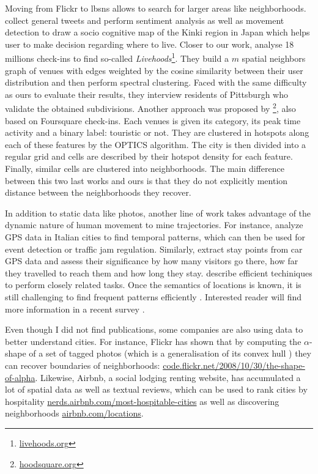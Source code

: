 Moving from Flickr to \glspl{lbsn} allows to search for larger areas like
neighborhoods. \Textcite{SocioMap12} collect general tweets and perform
sentiment analysis as well as movement detection to draw a socio cognitive map
of the Kinki region in Japan which helps user to make decision regarding where
to live. Closer to our work, \textcite{Livehoods12} analyse 18 millions
check-ins to find so-called
\emph{Livehoods}\footnote{\href{http://livehoods.org/}{\url{livehoods.org}}}.
They build a $m$ spatial neighbors graph of venues with edges weighted by the
cosine similarity between their user distribution and then perform spectral
clustering. Faced with the same difficulty as ours to evaluate their results, they
interview residents of Pittsburgh who validate the obtained subdivisions.
Another approach was proposed by
\textcite{Hoodsquare13}\footnote{\href{http://pizza.cl.cam.ac.uk/hoodsquare/}%
{\url{hoodsquare.org}}}, also based on Foursquare check-ins. Each
venues is given its category, its peak time activity and a binary
label: touristic or not. They are clustered in hotspots along each of
these features by the OPTICS algorithm. The city is then divided into a regular grid
and cells are described by their hotspot density for each feature.
 Finally, similar cells are clustered into
neighborhoods. The main difference between this two last works and ours is that
they do not explicitly mention distance between the neighborhoods they
recover.

In addition to static data like photos, another line of work takes advantage
of the dynamic nature of human movement to mine trajectories. For instance,
\textcite{MAtlas11} analyze GPS data in Italian cities to find temporal
patterns, which can then be used for event detection or traffic jam
regulation. Similarly, \textcite{GPSStay10} extract stay points from car GPS
data and assess their significance by how many visitors go there, how far they
travelled to reach them and how long they stay. \Textcite{TrajROI11} describe
efficient techiniques to perform closely related tasks. Once the semantics of
locations is known, it is still challenging to find frequent patterns
efficiently \autocite{SemanticTrajectories14}. Interested reader will find
more information in a recent survey \autocite{TrajSurvey13}.

Even though I did not find publications, some companies are also using data to
better understand cities. For instance, Flickr has shown that by computing the
$\alpha$-shape of a set of tagged photos (which is a generalisation of its
convex hull \autocite{AlphaShape83}) they can recover boundaries of
neighborhoods: \href{http://code.flickr.net/2008/10/30/the-shape-of-alpha/}%
{\url{code.flickr.net/2008/10/30/the-shape-of-alpha}}. Likewise, Airbnb, a
social lodging renting website, has accumulated a lot of spatial data as well
as textual reviews, which can be used to rank cities by hospitality
\href{http://nerds.airbnb.com/most-hospitable-cities/}%
{\url{nerds.airbnb.com/most-hospitable-cities}} as well as discovering
neighborhoods
\href{https://www.airbnb.com/locations}{\url{airbnb.com/locations}}.

